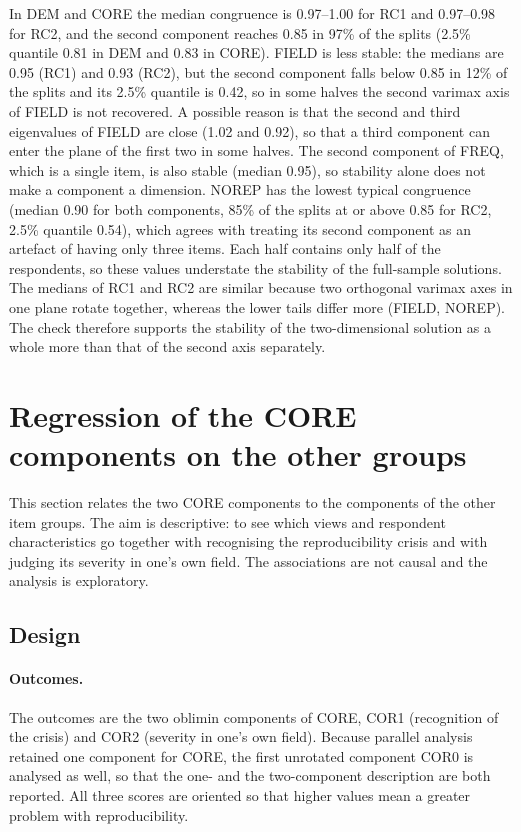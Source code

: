 \documentclass[11pt,a4paper]{article}
\begin{document}
In DEM and CORE the median congruence is 0.97--1.00 for RC1 and 0.97--0.98 for RC2, and the second component reaches 0.85 in 97\% of the splits (2.5\% quantile 0.81 in DEM and 0.83 in CORE). FIELD is less stable: the medians are 0.95 (RC1) and 0.93 (RC2), but the second component falls below 0.85 in 12\% of the splits and its 2.5\% quantile is 0.42, so in some halves the second varimax axis of FIELD is not recovered. A possible reason is that the second and third eigenvalues of FIELD are close (1.02 and 0.92), so that a third component can enter the plane of the first two in some halves. The second component of FREQ, which is a single item, is also stable (median 0.95), so stability alone does not make a component a dimension. NOREP has the lowest typical congruence (median 0.90 for both components, 85\% of the splits at or above 0.85 for RC2, 2.5\% quantile 0.54), which agrees with treating its second component as an artefact of having only three items. Each half contains only half of the respondents, so these values understate the stability of the full-sample solutions. The medians of RC1 and RC2 are similar because two orthogonal varimax axes in one plane rotate together, whereas the lower tails differ more (FIELD, NOREP). The check therefore supports the stability of the two-dimensional solution as a whole more than that of the second axis separately.

\section{Regression of the CORE components on the other groups}
\label{sec:reg}

This section relates the two CORE components to the components of the other item groups. The aim is descriptive: to see which views and respondent characteristics go together with recognising the reproducibility crisis and with judging its severity in one's own field. The associations are not causal and the analysis is exploratory.

\subsection{Design}

\paragraph{Outcomes.}
The outcomes are the two oblimin components of CORE, COR1 (recognition of the crisis) and COR2 (severity in one's own field). Because parallel analysis retained one component for CORE, the first unrotated component COR0 is analysed as well, so that the one- and the two-component description are both reported. All three scores are oriented so that higher values mean a greater problem with reproducibility.
\end{document}

